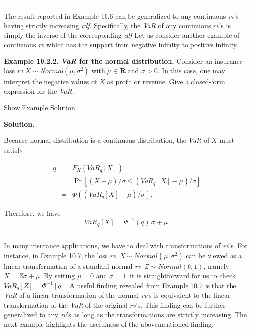 \documentclass[]{book}
\theoremstyle{definition}
\theoremstyle{definition}
\theoremstyle{definition}
\theoremstyle{remark}
\begin{document}
\begin{center}\rule{0.5\linewidth}{\linethickness}\end{center}

The result reported in Example 10.6 can be generalized to any continuous
\emph{rv}'s having strictly increasing \emph{cdf}. Specifically, the
\emph{VaR} of any continuous \emph{rv}'s is simply the inverse of the
corresponding \emph{cdf} Let us consider another example of continuous
\emph{rv} which has the support from negative infinity to positive
infinity.

\textbf{Example 10.2.2. \emph{VaR} for the normal distribution.}
Consider an insurance loss \emph{rv} \(X\sim Normal(\mu,\sigma^2)\) with
\(\mu\in \mathbf{R}\) and \(\sigma>0\). In this case, one may interpret
the negative values of \(X\) as profit or revenue. Give a closed-form
expression for the \emph{VaR}.

Show Example Solution

\hypertarget{toggleExamplePortMgt.2.2}{}
\textbf{Solution.}

Because normal distribution is a continuous distribution, the \emph{VaR}
of \(X\) must satisfy

\begin{eqnarray*}
 q &=& F_X(VaR_q[X])\\
&=&\Pr\left[(X-\mu)/\sigma\leq (VaR_q[X]-\mu)/\sigma\right]\\
&=&\Phi((VaR_q[X]-\mu)/\sigma).
\end{eqnarray*}

Therefore, we have \[
VaR_q[X]=\Phi^{-1}(q)\ \sigma+\mu.
\]

\begin{center}\rule{0.5\linewidth}{\linethickness}\end{center}

In many insurance applications, we have to deal with transformations of
\emph{rv}'s. For instance, in Example 10.7, the loss
\emph{rv}~\(X\sim Normal(\mu, \sigma^2)\) can be viewed as a linear
transformation of a standard normal \emph{rv}~\(Z\sim Normal(0,1)\),
namely \(X=Z\sigma+\mu\). By setting \(\mu=0\) and \(\sigma=1\), it is
straightforward for us to check \(VaR_q[Z]=\Phi^{-1}[q].\) A useful
finding revealed from Example 10.7 is that the \emph{VaR} of a linear
transformation of the normal \emph{rv}'s is equivalent to the linear
transformation of the \emph{VaR} of the original \emph{rv}'s. This
finding can be further generalized to any \emph{rv}'s as long as the
transformations are strictly increasing. The next example highlights the
usefulness of the abovementioned finding.
\end{document}

